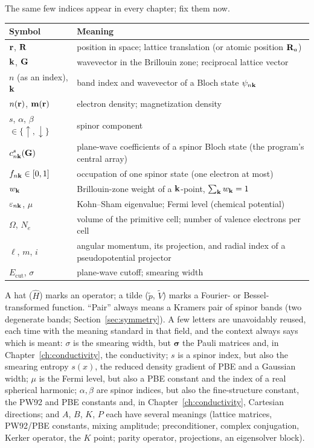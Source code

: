 The same few indices appear in every chapter; fix them now.
\begin{center}
\begin{tabular}{@{}lp{}@{}}
\toprule
Symbol & Meaning\\
\midrule
$\mathbf{r}$, $\mathbf{R}$ & position in space; lattice translation (or atomic position
$\mathbf{R}_a$)\\
$\mathbf{k}$, $\mathbf{G}$ & wavevector in the Brillouin zone; reciprocal lattice vector\\
$n$ (as an index), $\mathbf{k}$ & band index and wavevector of a Bloch state
$\psi_{n\mathbf{k}}$\\
$n(\mathbf{r})$, $\mathbf m(\mathbf{r})$ & electron density; magnetization density\\
$s$, $\alpha$, $\beta$ $\in\{\uparrow,\downarrow\}$ & spinor component\\
$c^{s}_{n\mathbf{k}}(\mathbf{G})$ & plane-wave coefficients of a spinor Bloch state
(the program's central array)\\
$f_{n\mathbf{k}} \in [0,1]$ & occupation of one spinor state (one electron at
most)\\
$w_{\mathbf{k}}$ & Brillouin-zone weight of a $\mathbf{k}$-point, $\sum_{\mathbf{k}} w_{\mathbf{k}} = 1$\\
$\varepsilon_{n\mathbf{k}}$, $\mu$ & Kohn--Sham eigenvalue; Fermi level (chemical
potential)\\
$\Omega$, $N_e$ & volume of the primitive cell; number of valence electrons
per cell\\
$\ell$, $m$, $i$ & angular momentum, its projection, and radial index of a
pseudopotential projector\\
$E_{\mathrm{cut}}$, $\sigma$ & plane-wave cutoff; smearing width\\
\bottomrule
\end{tabular}
\end{center}
A hat ($\hat H$) marks an operator; a tilde ($\tilde p$, $\tilde V$) marks
a Fourier- or Bessel-transformed function. ``Pair'' always means a
Kramers pair of spinor bands (two degenerate bands; Section~\ref{sec:symmetry}).
A few letters are unavoidably reused, each time with the meaning standard
in that field, and the context always says which is meant: $\sigma$ is the
smearing width, but $\bm\sigma$ the Pauli matrices and, in
Chapter~\ref{ch:conductivity}, the conductivity; $s$ is a spinor index, but
also the smearing entropy $s(x)$, the reduced density gradient of PBE and a
Gaussian width; $\mu$ is the Fermi level, but also a PBE constant and the
index of a real spherical harmonic; $\alpha,\beta$ are spinor indices, but
also the fine-structure constant, the PW92 and PBE constants and, in
Chapter~\ref{ch:conductivity}, Cartesian directions; and $A$, $B$, $K$, $P$
each have several meanings (lattice matrices, PW92/PBE constants, mixing
amplitude; preconditioner, complex conjugation, Kerker operator, the
$K$ point; parity operator, projections, an eigensolver block).
